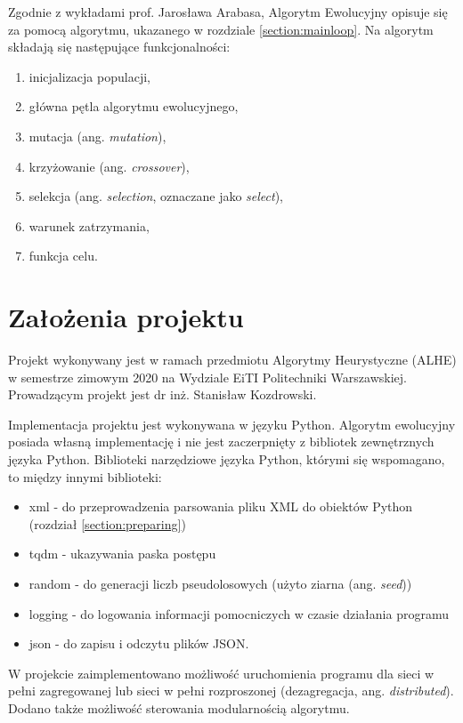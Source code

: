 Zgodnie z wykładami prof. Jarosława Arabasa, Algorytm Ewolucyjny opisuje się za pomocą algorytmu, ukazanego w rozdziale \ref{section:mainloop}. Na algorytm składają się następujące funkcjonalności:
\begin{enumerate}
    \item inicjalizacja populacji,
    \item główna pętla algorytmu ewolucyjnego,
    \item mutacja (ang. \textit{mutation}),
    \item krzyżowanie (ang. \textit{crossover}),
    \item selekcja (ang. \textit{selection}, oznaczane jako \textit{select}),
    \item warunek zatrzymania,
    \item funkcja celu.
\end{enumerate}

\section{Założenia projektu}

Projekt wykonywany jest w ramach przedmiotu Algorytmy Heurystyczne (ALHE) w semestrze zimowym 2020 na Wydziale EiTI Politechniki Warszawskiej. Prowadzącym projekt jest dr inż. Stanisław Kozdrowski.

Implementacja projektu jest wykonywana w języku Python. Algorytm ewolucyjny posiada własną implementację i nie jest zaczerpnięty z bibliotek zewnętrznych języka Python. Biblioteki narzędziowe języka Python, którymi się wspomagano, to między innymi biblioteki:
\begin{itemize}
    \item xml - do przeprowadzenia parsowania pliku XML do obiektów Python (rozdział \ref{section:preparing})
    \item tqdm - ukazywania paska postępu
    \item random - do generacji liczb pseudolosowych (użyto ziarna (ang. \textit{seed}))
    \item logging - do logowania informacji pomocniczych w czasie działania programu
    \item json - do zapisu i odczytu plików JSON.
\end{itemize}

W projekcie zaimplementowano możliwość uruchomienia programu dla sieci w pełni zagregowanej lub sieci w pełni rozproszonej (dezagregacja, ang. \textit{distributed}). Dodano także możliwość sterowania modularnością algorytmu.

